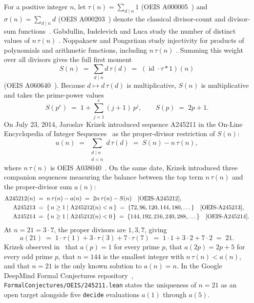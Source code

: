 \documentclass[11pt,reqno]{amsart}
\theoremstyle{plain}
\theoremstyle{definition}
\theoremstyle{remark}
\newcommand{\leanid}[1]{\texttt{\upshape\def\_{\char95\relax}#1}}
\begin{document}
For a positive integer $n$, let $\tau(n) = \sum_{d \mid n} 1$ (OEIS A000005~\cite{OEIS-A000005}) and $\sigma(n) = \sum_{d \mid n} d$ (OEIS A000203~\cite{OEIS-A000203}) denote the classical divisor-count and divisor-sum functions~\cite{Apostol1976,Burton1976,Tattersall1999}. Gabdullin, Iudelevich and Luca study the number of distinct values of $n\,\tau(n)$ \cite{GabdullinIudelevich2023}. Noppakaew and Pongsriiam study injectivity for products of polynomials and arithmetic functions, including $n\,\tau(n)$ \cite{NoppakaewPongsriiam2023}. Summing this weight over all divisors gives the full first moment
\[
  S(n) \;=\; \sum_{d \mid n} d\,\tau(d)
  \;=\; (\operatorname{id}\cdot\tau * 1)(n)
\]
(OEIS A060640~\cite{OEIS-A060640}). Because $d \mapsto d\,\tau(d)$ is multiplicative, $S(n)$ is multiplicative and takes the prime-power values
\[
  S(p^e) \;=\; 1 + \sum_{j=1}^e (j + 1)\,p^j,
  \qquad
  S(p) \;=\; 2p + 1.
\]
On July 23, 2014, Jaroslav Krizek introduced sequence A245211 in the On-Line Encyclopedia of Integer Sequences~\cite{OEIS-A245211} as the proper-divisor restriction of $S(n)$:
\[
  a(n) \;=\; \sum_{\substack{d \mid n \\ d < n}} d\,\tau(d)
  \;=\; S(n) - n\,\tau(n),
\]
where $n\,\tau(n)$ is OEIS A038040~\cite{OEIS-A038040}. On the same date, Krizek introduced three companion sequences measuring the balance between the top term $n\,\tau(n)$ and the proper-divisor sum $a(n)$:
\begin{align*}
  \text{A245212}(n) &\;=\; n\,\tau(n) - a(n) \;=\; 2n\,\tau(n) - S(n) \quad\text{\cite{OEIS-A245212}}, \\
  \text{A245213} &\;=\; \{\,n \ge 1 \mid \text{A245212}(n) < n\,\} \;=\; \{72, 96, 120, 144, 180, \dots\} \quad\text{\cite{OEIS-A245213}}, \\
  \text{A245214} &\;=\; \{\,n \ge 1 \mid \text{A245212}(n) < 0\,\} \;=\; \{144, 192, 216, 240, 288, \dots\} \quad\text{\cite{OEIS-A245214}}.
\end{align*}
At $n = 21 = 3 \cdot 7$, the proper divisors are $1, 3, 7$, giving
\[
  a(21) \;=\; 1\cdot\tau(1) + 3\cdot\tau(3) + 7\cdot\tau(7) \;=\; 1\cdot 1 + 3\cdot 2 + 7\cdot 2 \;=\; 21.
\]
Krizek observed in~\cite{OEIS-A245211} that $a(p) = 1$ for every prime $p$, that $a(2p) = 2p + 5$ for every odd prime $p$, that $n = 144$ is the smallest integer with $n\,\tau(n) < a(n)$, and that $n = 21$ is the only known solution to $a(n) = n$. In the Google DeepMind Formal Conjectures repository~\cite{FormalConjectures2026}, \texttt{FormalConjectures/OEIS/245211.lean} states the uniqueness of $n = 21$ as an open target alongside five \leanid{decide} evaluations $a(1)$ through $a(5)$.
\end{document}
